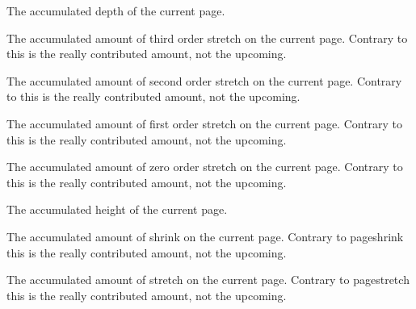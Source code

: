 \stopoldprimitive

\startnewprimitive[title={\prm {pagelastdepth}}]

The accumulated depth of the current page.

\stopnewprimitive

\startnewprimitive[title={\prm {pagelastfilllstretch}}]

The accumulated amount of third order stretch on the current page. Contrary to
 this is the really contributed amount, not the upcoming.

\stopnewprimitive

\startnewprimitive[title={\prm {pagelastfillstretch}}]

The accumulated amount of second order stretch on the current page. Contrary to
 this is the really contributed amount, not the upcoming.

\stopnewprimitive

\startnewprimitive[title={\prm {pagelastfilstretch}}]

The accumulated amount of first order stretch on the current page. Contrary to
 this is the really contributed amount, not the upcoming.

\stopnewprimitive

\startnewprimitive[title={\prm {pagelastfistretch}}]

The accumulated amount of zero order stretch on the current page. Contrary to
 this is the really contributed amount, not the upcoming.

\stopnewprimitive

\startnewprimitive[title={\prm {pagelastheight}}]

The accumulated height of the current page.

\stopnewprimitive

\startnewprimitive[title={\prm {pagelastshrink}}]

The accumulated amount of shrink on the current page. Contrary to \prm
{pageshrink} this is the really contributed amount, not the upcoming.

\stopnewprimitive

\startnewprimitive[title={\prm {pagelaststretch}}]

The accumulated amount of stretch on the current page. Contrary to \prm
{pagestretch} this is the really contributed amount, not the upcoming.

\stopnewprimitive

